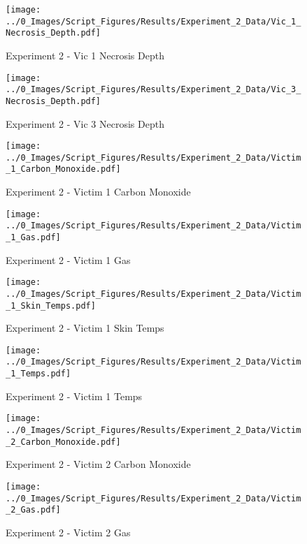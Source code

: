 	\begin{figure}[H]
		\centering
		\texttt{[image: ../0\_Images/Script\_Figures/Results/Experiment\_2\_Data/Vic\_1\_Necrosis\_Depth.pdf]}
		\caption[]{Experiment 2 - Vic 1 Necrosis Depth}
	\end{figure}
 
	\clearpage

	\begin{figure}[H]
		\centering
		\texttt{[image: ../0\_Images/Script\_Figures/Results/Experiment\_2\_Data/Vic\_3\_Necrosis\_Depth.pdf]}
		\caption[]{Experiment 2 - Vic 3 Necrosis Depth}
	\end{figure}
 

	\begin{figure}[H]
		\centering
		\texttt{[image: ../0\_Images/Script\_Figures/Results/Experiment\_2\_Data/Victim\_1\_Carbon\_Monoxide.pdf]}
		\caption[]{Experiment 2 - Victim 1 Carbon Monoxide}
	\end{figure}
 
	\clearpage

	\begin{figure}[H]
		\centering
		\texttt{[image: ../0\_Images/Script\_Figures/Results/Experiment\_2\_Data/Victim\_1\_Gas.pdf]}
		\caption[]{Experiment 2 - Victim 1 Gas}
	\end{figure}
 

	\begin{figure}[H]
		\centering
		\texttt{[image: ../0\_Images/Script\_Figures/Results/Experiment\_2\_Data/Victim\_1\_Skin\_Temps.pdf]}
		\caption[]{Experiment 2 - Victim 1 Skin Temps}
	\end{figure}
 
	\clearpage

	\begin{figure}[H]
		\centering
		\texttt{[image: ../0\_Images/Script\_Figures/Results/Experiment\_2\_Data/Victim\_1\_Temps.pdf]}
		\caption[]{Experiment 2 - Victim 1 Temps}
	\end{figure}
 

	\begin{figure}[H]
		\centering
		\texttt{[image: ../0\_Images/Script\_Figures/Results/Experiment\_2\_Data/Victim\_2\_Carbon\_Monoxide.pdf]}
		\caption[]{Experiment 2 - Victim 2 Carbon Monoxide}
	\end{figure}
 
	\clearpage

	\begin{figure}[H]
		\centering
		\texttt{[image: ../0\_Images/Script\_Figures/Results/Experiment\_2\_Data/Victim\_2\_Gas.pdf]}
		\caption[]{Experiment 2 - Victim 2 Gas}
	\end{figure}
 

